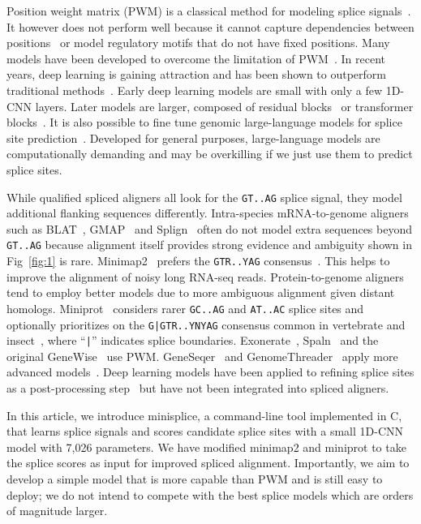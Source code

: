 \documentclass[webpdf,contemporary,large,namedate]{oup-authoring-template}%
\begin{document}
Position weight matrix (PWM) is a classical method for modeling splice signals~\citep{Staden:1984aa}.
It however does not perform well because it cannot capture dependencies between positions~\citep{Burge:1997uu}
or model regulatory motifs that do not have fixed positions.
Many models have been developed to overcome the limitation of PWM~\citep{Capitanchik:2025aa}.
In recent years, deep learning is gaining attraction
and has been shown to outperform traditional methods~\citep{Zhang:2018aa,DBLP:journals/access/DuYDZZL18,Albaradei:2020aa}.
Early deep learning models are small with only a few 1D-CNN layers.
Later models are larger, composed of residual blocks~\citep{Jaganathan:2019aa,Zeng:2022aa,Xu:2024aa,Chao:2024aa} or transformer blocks~\citep{You:2024aa,Chen:2024aa}.
It is also possible to fine tune genomic large-language models for splice site prediction~\citep{Nguyen:2023aa,Dalla-Torre:2025aa,Brixi2025.02.18.638918}.
Developed for general purposes, large-language models are computationally demanding and may be overkilling if we just use them to predict splice sites.

While qualified spliced aligners all look for the {\tt GT..AG} splice signal,
they model additional flanking sequences differently.
Intra-species mRNA-to-genome aligners such as BLAT~\citep{Kent:2002jk}, GMAP~\citep{Wu:2005vn} and Splign~\citep{Kapustin:2008tq} often do not model extra sequences beyond {\tt GT..AG}
because alignment itself provides strong evidence and ambiguity shown in Fig~\ref{fig:1} is rare.
Minimap2~\citep{Li:2018ab} prefers the {\tt GTR..YAG} consensus~\citep{Irimia:2008aa}.
This helps to improve the alignment of noisy long RNA-seq reads.
Protein-to-genome aligners tend to employ better models due to more ambiguous alignment given distant homologs.
Miniprot~\citep{Li:2023ab} considers rarer {\tt GC..AG} and {\tt AT..AC} splice sites and optionally prioritizes on the {\tt G|GTR..YNYAG} consensus
common in vertebrate and insect~\citep{Iwata:2011aa}, where ``{\tt |}'' indicates splice boundaries.
Exonerate~\citep{Slater:2005aa}, Spaln~\citep{Gotoh:2008aa,Iwata:2012aa,Gotoh:2024aa} and the original GeneWise~\citep{Birney:2004uy} use PWM.
GeneSeqer~\citep{Usuka:2000vi} and GenomeThreader~\citep{DBLP:journals/infsof/GremmeBSK05} apply more advanced models~\citep{Brendel:1998aa,Brendel:2004aa}.
Deep learning models have been applied to refining splice sites as a post-processing step~\citep{Chao:2024aa,Xia:2023aa}
but have not been integrated into spliced aligners.

In this article, we introduce minisplice, a command-line tool implemented in C,
that learns splice signals and scores candidate splice sites with a small 1D-CNN model with 7,026 parameters.
We have modified minimap2 and miniprot to take the splice scores as input for improved spliced alignment.
Importantly, we aim to develop a simple model that is more capable than PWM and is still easy to deploy;
we do not intend to compete with the best splice models which are orders of magnitude larger.
\end{document}
